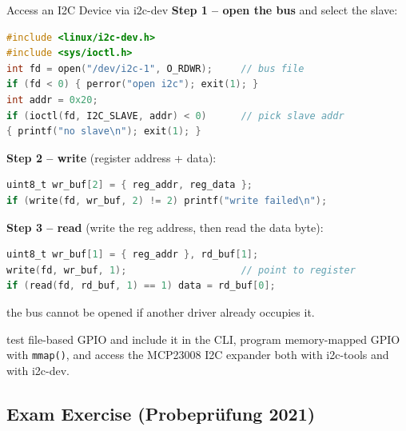 \begin{KR}{Access an I2C Device via i2c-dev}
    \textbf{Step 1 -- open the bus} and select the slave:
\begin{lstlisting}[language=C, style=basesmol, aboveskip=2pt, belowskip=2pt]
#include <linux/i2c-dev.h>
#include <sys/ioctl.h>
int fd = open("/dev/i2c-1", O_RDWR);     // bus file
if (fd < 0) { perror("open i2c"); exit(1); }
int addr = 0x20;
if (ioctl(fd, I2C_SLAVE, addr) < 0)      // pick slave addr
{ printf("no slave\n"); exit(1); }
\end{lstlisting}
    \textbf{Step 2 -- write} (register address + data):
\begin{lstlisting}[language=C, style=basesmol, aboveskip=2pt, belowskip=2pt]
uint8_t wr_buf[2] = { reg_addr, reg_data };
if (write(fd, wr_buf, 2) != 2) printf("write failed\n");
\end{lstlisting}
    \textbf{Step 3 -- read} (write the reg address, then read the data byte):
\begin{lstlisting}[language=C, style=basesmol, aboveskip=2pt, belowskip=2pt]
uint8_t wr_buf[1] = { reg_addr }, rd_buf[1];
write(fd, wr_buf, 1);                    // point to register
if (read(fd, rd_buf, 1) == 1) data = rd_buf[0];
\end{lstlisting}
     the bus cannot be opened if another driver already occupies it.
\end{KR}

\begin{remark}
     test file-based GPIO and include it in the CLI,
    program memory-mapped GPIO with \texttt{mmap()}, and access the MCP23008 I2C
    expander both with i2c-tools and with i2c-dev.
\end{remark}

\subsection{Exam Exercise (Probepr\"ufung 2021)}

